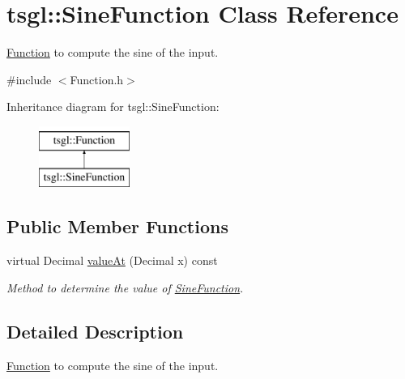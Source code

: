 \hypertarget{classtsgl_1_1_sine_function}{\section{tsgl\-:\-:\-Sine\-Function \-Class \-Reference}
\label{classtsgl_1_1_sine_function}
}


\hyperlink{classtsgl_1_1_function}{\-Function} to compute the sine of the input.  




{\ttfamily \#include $<$\-Function.\-h$>$}

\-Inheritance diagram for tsgl\-:\-:\-Sine\-Function\-:\begin{figure}[H]
\begin{center}
\leavevmode
\includegraphics[height=2.000000cm]{classtsgl_1_1_sine_function}
\end{center}
\end{figure}
\subsection*{\-Public \-Member \-Functions}
\begin{DoxyCompactItemize}
\item 
virtual \-Decimal \hyperlink{classtsgl_1_1_sine_function_a6507b049141d946ede1611050e44dab2}{value\-At} (\-Decimal x) const 
\begin{DoxyCompactList}\small\item\em \-Method to determine the value of \hyperlink{classtsgl_1_1_sine_function}{\-Sine\-Function}. \end{DoxyCompactList}\end{DoxyCompactItemize}


\subsection{\-Detailed \-Description}
\hyperlink{classtsgl_1_1_function}{\-Function} to compute the sine of the input. 

